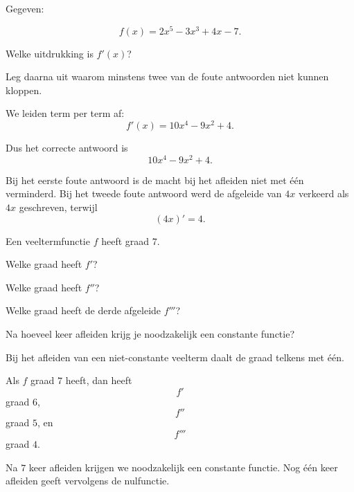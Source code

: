 \documentclass{ximera}
\begin{document}
\begin{oefening}{\oefB\ESS}

Gegeven:

\[
f(x)=2x^5-3x^3+4x-7.
\]

Welke uitdrukking is $f'(x)$?

\begin{multipleChoice}
\end{multipleChoice}

Leg daarna uit waarom minstens twee van de foute antwoorden niet
kunnen kloppen.

\begin{oplossing}

We leiden term per term af:
\[
f'(x)=10x^4-9x^2+4.
\]

Dus het correcte antwoord is
\[
\boxed{10x^4-9x^2+4}.
\]

Bij het eerste foute antwoord is de macht bij het afleiden niet met één
verminderd. Bij het tweede foute antwoord werd de afgeleide van $4x$
verkeerd als $4x$ geschreven, terwijl
\[
(4x)'=4.
\]

\end{oplossing}

\end{oefening}



\begin{oefening}{\oefB}

Een veeltermfunctie $f$ heeft graad $7$.

\begin{question}
Welke graad heeft $f'$?
\end{question}

\begin{question}
Welke graad heeft $f''$?
\end{question}

\begin{question}
Welke graad heeft de derde afgeleide $f'''$?
\end{question}

\begin{question}
Na hoeveel keer afleiden krijg je noodzakelijk een constante functie?
\end{question}

\begin{oplossing}

Bij het afleiden van een niet-constante veelterm daalt de graad telkens met
één.

Als $f$ graad $7$ heeft, dan heeft
\[
f'
\]
graad $6$,
\[
f''
\]
graad $5$,
en
\[
f'''
\]
graad $4$.

Na $7$ keer afleiden krijgen we noodzakelijk een constante functie.
Nog één keer afleiden geeft vervolgens de nulfunctie.

\end{oplossing}

\end{oefening}
\end{document}
